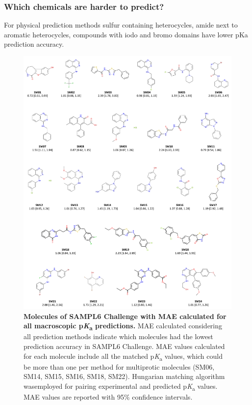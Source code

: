\documentclass[9pt,lineno,final]{elife}
\newcommand{\pKa}{p\textit{K}\textsubscript{a}}
\begin{document}
\subsubsection{Which chemicals are harder to predict?}

For physical prediction methods sulfur containing heterocycles, amide next to aromatic heterocycles, compounds with iodo and bromo domains have lower pKa prediction accuracy.

\begin{figure}
\begin{center}
\includegraphics[width=0.95\linewidth]{figures/molecules_with_MAE_of_all_methods.pdf}
\caption{{\bf Molecules of SAMPL6 Challenge with MAE calculated for all macroscopic \pKa{} predictions.} MAE calculated considering all prediction methods indicate which molecules had the lowest prediction accuracy in SAMPL6 Challenge. MAE values calculated for each molecule include all the matched \pKa{} values, which could be more than one per method for multiprotic molecules (SM06, SM14, SM15, SM16, SM18, SM22). Hungarian matching algorithm wasemployed for pairing experimental and predicted \pKa{} values. MAE values are reported with 95\% confidence intervals.
}
\label{fig:molecules_with_MAE_of_all_methods}
\end{center}
\end{figure}
\end{document}
